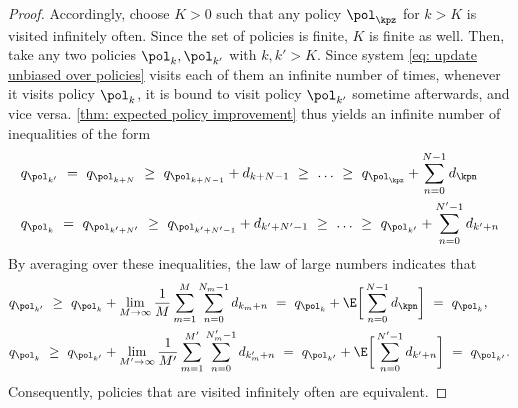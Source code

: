 \begin{proof}
Accordingly, choose $K>0$ such that any policy $\pol_\kpz$ for $k>K$ is visited infinitely often.
Since the set of policies is finite, $K$ is finite as well.
Then, take any two policies $\pol_k, \pol_{k'}$ with $k, k' > K$.
Since system \eqref{eq: update unbiased over policies} visits each of them an infinite number of times, 
whenever it visits policy $\pol_k$, it is bound to visit policy $\pol_{k'}$ sometime afterwards, and vice versa.
\autoref{thm: expected policy improvement} thus yields an infinite number of inequalities of the form
\begin{align*}
    &q_{\pol_{k'}} 
    \ = \ q_{\pol_{k+N}} 
    \ \geq \ q_{\pol_{k+N-1}} + d_{k+N-1}
    \ \geq \ \dots 
    \ \geq \ q_{\pol_\kpz} + \sum_{n=0}^{N-1} d_\kpn 
    \\
    &q_{\pol_k}
    \ = \ q_{\pol_{k'+N'}}
    \ \geq \ q_{\pol_{k'+N'-1}} + d_{k'+N'-1}
    \ \geq \ \dots 
    \ \geq \ q_{\pol_{k'}} + \sum_{n=0}^{N'-1} d_{k'+n}
\end{align*}
By averaging over these inequalities, the law of large numbers indicates that
\begin{align*}
    &q_{\pol_{k'}} 
    \ \geq \ q_{\pol_k} + \lim_{M \to \infty} \dfrac{1}{M} \sum_{m=1}^{M} \sum_{n=0}^{N_m-1} d_{k_m + n}
    \ = \ q_{\pol_k} + \E \bigg[ \sum_{n=0}^{N-1} d_\kpn \bigg]
    \ = \ q_{\pol_k} ,
    \\
    &q_{\pol_k} 
    \ \geq \ q_{\pol_{k'}} + \lim_{M' \to \infty} \dfrac{1}{M'} \sum_{m=1}^{M'} \sum_{n=0}^{N'_m-1} d_{k'_m + n}
    \ = \ q_{\pol_{k'}} + \E \bigg[ \sum_{n=0}^{N'-1} d_{k'+n} \bigg]
    \ = \ q_{\pol_{k'}} .
\end{align*}
Consequently, policies that are visited infinitely often are equivalent.
\end{proof}